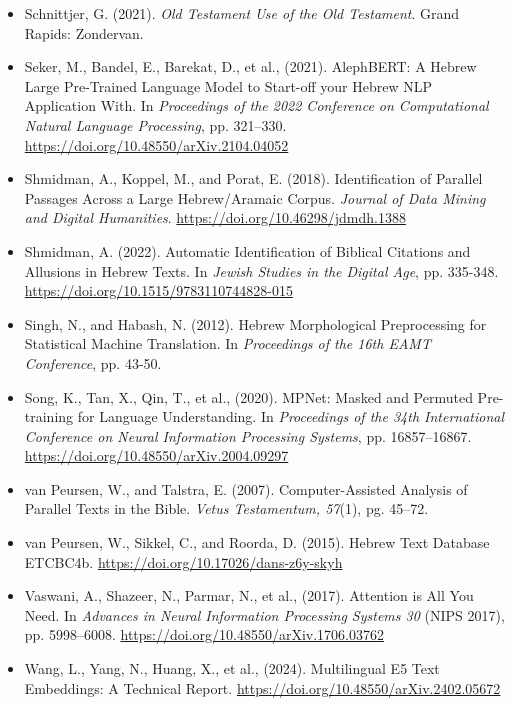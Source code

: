 \documentclass[12pt]{article}
\begin{document}
\begin{itemize}
    \item Schnittjer, G. (2021). \textit{Old Testament Use of the Old Testament}. Grand Rapids: Zondervan.
    \item Seker, M., Bandel, E., Barekat, D., et al., (2021). AlephBERT: A Hebrew Large Pre-Trained Language Model to Start-off your Hebrew NLP Application With. In \textit{Proceedings of the 2022 Conference on Computational Natural Language Processing}, pp. 321–330. \url{https://doi.org/10.48550/arXiv.2104.04052}
    \item Shmidman, A., Koppel, M., and Porat, E. (2018). Identification of Parallel Passages Across a Large Hebrew/Aramaic Corpus. \textit{Journal of Data Mining and Digital Humanities}. \url{https://doi.org/10.46298/jdmdh.1388}
    \item Shmidman, A. (2022). Automatic Identification of Biblical Citations and Allusions in Hebrew Texts. In \textit{Jewish Studies in the Digital Age}, pp. 335-348. \url{https://doi.org/10.1515/9783110744828-015}
    \item Singh, N., and Habash, N. (2012). Hebrew Morphological Preprocessing for Statistical Machine Translation. In \textit{Proceedings of the 16th EAMT Conference}, pp. 43-50.
    \item Song, K., Tan, X., Qin, T., et al., (2020). MPNet: Masked and Permuted Pre-training for Language Understanding. In \textit{Proceedings of the 34th International Conference on Neural Information Processing Systems}, pp. 16857–16867. \url{https://doi.org/10.48550/arXiv.2004.09297}
    \item van Peursen, W., and Talstra, E. (2007). Computer-Assisted Analysis of Parallel Texts in the Bible. \textit{Vetus Testamentum, 57}(1), pg. 45–72.
    \item van Peursen, W., Sikkel, C., and Roorda, D. (2015). Hebrew Text Database ETCBC4b. \url{https://doi.org/10.17026/dans-z6y-skyh}
    \item Vaswani, A., Shazeer, N., Parmar, N., et al., (2017). Attention is All You Need. In \textit{Advances in Neural Information Processing Systems 30} (NIPS 2017), pp. 5998–6008. \url{https://doi.org/10.48550/arXiv.1706.03762}
    \item Wang, L., Yang, N., Huang, X., et al., (2024). Multilingual E5 Text Embeddings: A Technical Report. \url{https://doi.org/10.48550/arXiv.2402.05672}
\end{itemize}
\end{document}
